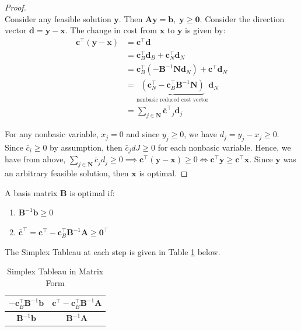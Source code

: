 \documentclass{article}
\begin{document}
\begin{proof}
    $ $ \\ Consider any feasible solution $\mathbf{y}$. Then $\mathbf{Ay} = \mathbf{b}, \; \mathbf{y} \geq \mathbf{0}$. Consider the direction vector $\mathbf{d} = \mathbf{y}- \mathbf{x}$. The change in cost from $\mathbf{x}$ to $\mathbf{y}$ is given by: \begin{align*}
        \mathbf{c}^{\top} (\mathbf{y} - \mathbf{x}) &= \mathbf{c}^{\top}\mathbf{d} \\ 
        &= \mathbf{c}^{\top}_B \mathbf{d}_B + \mathbf{c}^{\top}_N \mathbf{d}_N \\ 
        &= \mathbf{c}^{\top}_B (-\mathbf{B}^{-1}\mathbf{N}\mathbf{d}_N) + \mathbf{c}^{\top}\mathbf{d}_N \\ 
        &= \underbrace{(\mathbf{c}^{\top}_N - \mathbf{c}^{\top}_B \mathbf{B}^{-1}\mathbf{N})}_{\text{nonbasic reduced cost vector}} \mathbf{d}_N \\ 
        &= \sum_{j \in \mathbf{N}} \mathbf{\bar{c}^{\top}}_j\mathbf{d}_j
    \end{align*}

\noindent For any nonbasic variable, $x_j = 0$ and since $y_j \geq 0$, we have $d_j = y_j - x_j \geq 0$. Since $\bar{c}_i \geq 0$ by assumption, then $\bar{c}_j dJ \geq 0$ for each nonbasic variable. Hence, we have from above, $\sum_{j \in \mathbf{N}}\bar{c}_j d_j \geq 0 \implies \mathbf{c}^{\top}(\mathbf{y} - \mathbf{x}) \geq 0 \Longleftrightarrow \mathbf{c}^{\top}\mathbf{y} \geq \mathbf{c}^{\top}\mathbf{x}$. Since $\mathbf{y}$ was an arbitrary feasible solution, then $\mathbf{x}$ is optimal.  
\end{proof}

\begin{theorem}
    A basis matrix $\mathbf{B}$ is optimal if: \begin{enumerate}
        \item $\mathbf{B}^{-1}\mathbf{b} \geq 0$
        \item $\mathbf{\bar{c}^{\top}} = \mathbf{c}^{\top} - \mathbf{c}^{\top}_B \mathbf{B}^{-1}\mathbf{A} \geq \mathbf{0}^{\top}$  
    \end{enumerate}
\end{theorem}

\noindent The Simplex Tableau at each step is given in Table \ref{tab:2-simplextabmatrix} below. 

\begin{table}[H]
    \centering
    \begin{tabular}{c | c}
        $-\mathbf{c}^{\top}_B \mathbf{B}^{-1}\mathbf{b}$ & $\mathbf{c}^{\top} - \mathbf{c}^{\top}_B \mathbf{B}^{-1}\mathbf{A}$ \\ \hline 
        $\mathbf{B}^{-1}\mathbf{b}$ & $\mathbf{B}^{-1}\mathbf{A}$
    \end{tabular}
    \caption{Simplex Tableau in Matrix Form}
    \label{tab:2-simplextabmatrix}
\end{table}
\end{document}
